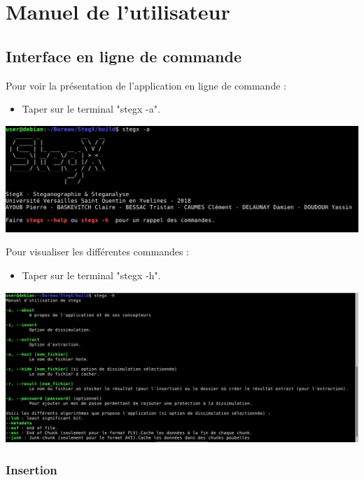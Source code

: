 \documentclass[11pt]{article}
\begin{document}
\section{Manuel de l'utilisateur}

\subsection{Interface en ligne de commande}

Pour voir la présentation de l'application en ligne de commande :
\begin{itemize}
\item Taper sur le terminal "stegx -a".
\end{itemize}

\vspace{0.5cm}
\hspace{0.5cm}
\includegraphics[scale=0.6]{pictures/present.png}
\vspace{1cm}

Pour visualiser les différentes commandes : 
\begin{itemize}
\item Taper sur le terminal "stegx -h".
\end{itemize}

\vspace{0.5cm}
\hspace{-0.5cm}
\includegraphics[scale=0.5]{pictures/help.png}
\vspace{1cm}

\subsubsection{Insertion}
\end{document}
